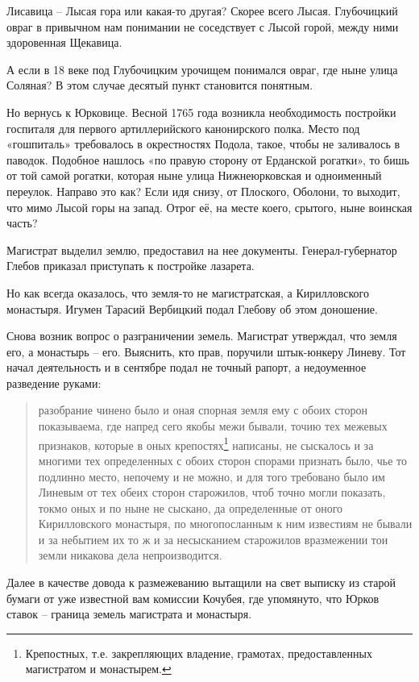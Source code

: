 Лисавица – Лысая гора или какая-то другая? Скорее всего Лысая. Глубочицкий овраг в привычном нам понимании не соседствует с Лысой горой, между ними здоровенная Щекавица. 

А если в 18 веке под Глубочицким урочищем понимался овраг, где ныне улица Соляная? В этом случае десятый пункт становится понятным.

Но вернусь к Юрковице. Весной 1765 года возникла необходимость постройки госпиталя для первого артиллерийского канонирского полка. Место под «гошпиталь» требовалось в окрестностях Подола, такое, чтобы не заливалось в паводок. Подобное нашлось «по правую сторону от Ерданской рогатки», то бишь от той самой рогатки, которая ныне улица Нижнеюрковская и одноименный переулок. Направо это как? Если идя снизу, от Плоского, Оболони, то выходит, что мимо Лысой горы на запад. Отрог её, на месте коего, срытого, ныне воинская часть?

Магистрат выделил землю, предоставил на нее документы. Генерал-губернатор Глебов приказал приступать к постройке лазарета.

Но как всегда оказалось, что земля-то не магистратская, а Кирилловского монастыря. Игумен Тарасий Вербицкий подал Глебову об этом доношение.

Снова возник вопрос о разграничении земель. Магистрат утверждал, что земля его, а монастырь – его. Выяснить, кто прав, поручили штык-юнкеру Линеву. Тот начал деятельность и в сентябре подал не точный рапорт, а недоуменное разведение руками:

\begin{quotation}
разобрание чинено было и оная спорная земля ему с обоих сторон показываема, где напред сего якобы межи бывали, точию тех межевых признаков, которые в оных крепостях\footnote{Крепостных, т.е. закрепляющих владение, грамотах, предоставленных магистратом и монастырем.} написаны, не сыскалось и за многими тех определенных с обоих сторон спорами признать было, чье то подлинно место, непочему и не можно, и для того требовано было им Линевым от тех обеих сторон старожилов, чтоб точно могли показать, токмо оных и по ныне не сыскано, да определенные от оного Кирилловского монастыря, по многопосланным к ним известиям не бывали и за небытием их то ж и за несысканием старожилов вразмежении тои земли никакова дела непроизводится.
\end{quotation}

Далее в качестве довода к размежеванию вытащили на свет выписку из старой бумаги от уже известной вам комиссии Кочубея, где упомянуто, что Юрков ставок – граница земель магистрата и монастыря.

